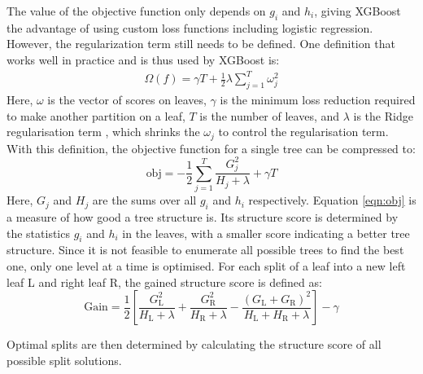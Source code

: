 The value of the objective function only depends on $g_i$ and $h_i$, giving XGBoost the advantage of using custom loss functions including logistic regression.
However, the regularization term still needs to be defined. One definition that works well in practice and is thus used by XGBoost is:
\begin{align}
  \Omega (f) = \gamma T + \frac{1}{2}\lambda \sum_{j=1}^T \omega_j^2
\end{align}
Here, $\omega$ is the vector of scores on leaves, $\gamma$ is the minimum loss reduction required to make
another partition on a leaf, $T$ is the number of leaves, and $\lambda$ is the Ridge regularisation term \cite{ridge}, which shrinks the $\omega_j$ to control the
regularisation term. \\
With this definition, the objective function for a single tree can be compressed to:
\begin{equation} \label{eqn:obj}
  \text{obj} = -\frac{1}{2}\sum_{j=1}^T \frac{G_j^2}{H_j + \lambda} + \gamma T
\end{equation}
Here, $G_j$ and $H_j$ are the sums over all $g_i$ and $h_i$ respectively. Equation \ref{eqn:obj} is a measure of how good a tree structure is. Its structure score
is determined by the statistics $g_i$ and $h_i$ in the leaves, with a smaller score indicating a better tree structure.
Since it is not feasible to enumerate all possible trees to find the best one, only one level at a time is optimised.
For each split of a leaf into a new left leaf L and right leaf R, the gained structure score is defined as:
\begin{equation}
  \text{Gain} = \frac{1}{2}\left[\frac{G_{\text{L}}^2}{H_{\text{L}} + \lambda} + \frac{G_{\text{R}}^2}{H_{\text{R}} + \lambda} - \frac{(G_{\text{L}} + G_{\text{R}})^2}{H_{\text{L}}+H_{\text{R}}+\lambda}\right] -\gamma
\end{equation}

Optimal splits are then determined by calculating the structure score of all possible split solutions. \\

